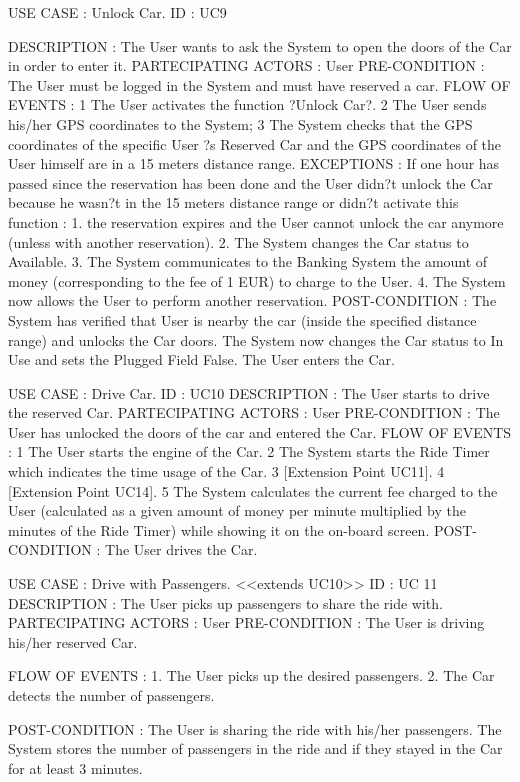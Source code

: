 USE CASE : Unlock Car.
ID : UC9

DESCRIPTION : The User wants to ask the System to open the doors of the Car in order  to enter it.
PARTECIPATING ACTORS : User  
PRE-CONDITION : The User must be logged in the System and must have reserved a car. 
FLOW OF EVENTS : 
1 The User activates the function ?Unlock Car?.
2 The User  sends his/her GPS coordinates to the System; 
3 The System checks that the GPS coordinates of the specific User ?s Reserved Car and the GPS coordinates of the User himself are in a 15 meters distance range. 
EXCEPTIONS :
If one hour has passed since the reservation has been done and the User didn?t unlock the Car because he wasn?t in the 15 meters distance range or didn?t activate this function :
1. the reservation expires and the User cannot unlock the car anymore (unless with another reservation). 
2. The System changes the Car status to Available.
3. The System communicates to the Banking System the amount of money (corresponding to the fee of 1 EUR) to charge to the User.
4. The System now allows the User to perform another reservation. 
POST-CONDITION :  
The System has verified that User is nearby the car (inside the specified distance range) and unlocks the Car doors. 
The System now changes the Car status to In Use and sets the Plugged Field False. 
The User enters the Car.



USE CASE : Drive Car. 
ID : UC10				
DESCRIPTION  : The User starts to drive the reserved Car.
PARTECIPATING ACTORS : User 
PRE-CONDITION : The User has unlocked the doors of the car and entered the Car.
FLOW OF EVENTS : 
1 The User starts the engine of the Car.
2 The System starts the Ride Timer which indicates the time usage of the Car.
3 [Extension Point UC11].
4 [Extension Point UC14].
5 The System calculates the current fee charged to the User (calculated as a given amount of money per minute multiplied by the minutes of the Ride Timer) while showing it on the on-board screen.
POST-CONDITION :  
The User drives the Car. 




USE CASE : Drive with Passengers.  <<extends UC10>>
ID : UC 11
DESCRIPTION : The User picks up passengers to share the ride with.
PARTECIPATING ACTORS : User
PRE-CONDITION : The User is driving his/her reserved Car.

FLOW OF EVENTS : 
1. The User picks up the desired passengers.
2. The Car detects the number of passengers.

POST-CONDITION :  
The User is sharing the ride with his/her passengers.
The System stores the number of passengers in the ride and if they stayed in the Car for at least 3 minutes.

